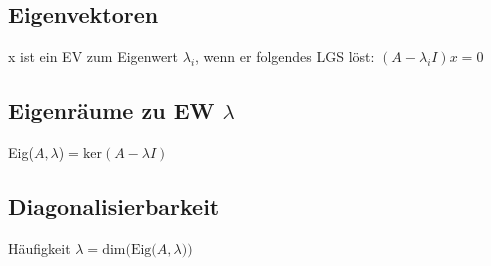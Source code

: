 \documentclass[ngerman,11pt,a4paper
,pdftex]{article}
\newcommand{\f}[1]{$#1$}
\theoremstyle{nodot}
\theoremstyle{nodot}
\begin{document}
\begin{multicols*}{3}
\begin{tcolorbox}[colback=white,bottom=10pt, top=10pt]
          \subsection*{Eigenvektoren}
          x ist ein EV zum Eigenwert \f{\lambda_i}, wenn er folgendes LGS löst:
          \f{(A-\lambda_iI)x=0}\\[5pt]
          \subsection*{Eigenräume zu EW \f{\lambda}}
          Eig(\f{A, \lambda})\f{=\text{ker}(A-\lambda I)}\\[5pt]
          \subsection*{Diagonalisierbarkeit}
          Häufigkeit \f{\lambda = \text{dim(Eig(}A,\lambda))}
        \end{tcolorbox}


        \end{multicols*}

    
\end{document}
